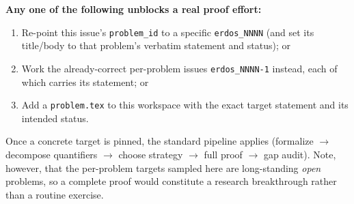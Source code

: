 \documentclass[12pt]{article}
\begin{document}
\textbf{Any one of the following unblocks a real proof effort:}
\begin{enumerate}
\item Re-point this issue's \texttt{problem\_id} to a specific
\texttt{erdos\_NNNN} (and set its title/body to that problem's verbatim
statement and status); or
\item Work the already-correct per-problem issues \texttt{erdos\_NNNN-1}
instead, each of which carries its statement; or
\item Add a \texttt{problem.tex} to this workspace with the exact target
statement and its intended status.
\end{enumerate}
Once a concrete target is pinned, the standard pipeline applies (formalize
$\to$ decompose quantifiers $\to$ choose strategy $\to$ full proof $\to$ gap
audit). Note, however, that the per-problem targets sampled here are
long-standing \emph{open} problems, so a complete proof would constitute a
research breakthrough rather than a routine exercise.
\end{document}
